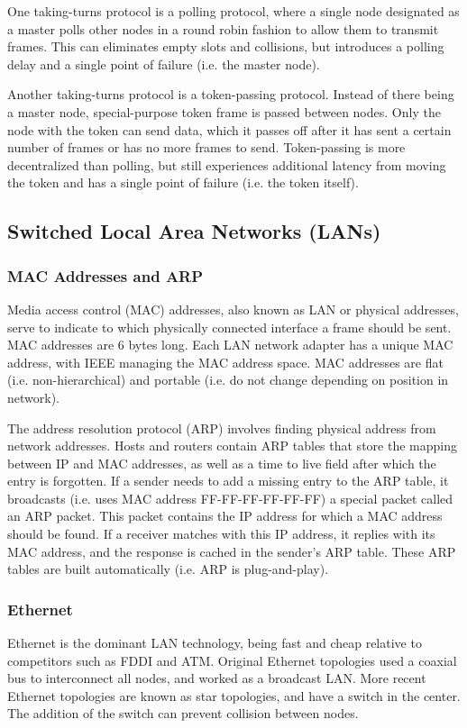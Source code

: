 \documentclass[12pt,titlepage]{article}
\begin{document}
        One taking-turns protocol is a polling protocol, where a single node designated as a master polls other nodes in a round robin fashion to allow them to
        transmit frames. This can eliminates empty slots and collisions, but introduces a polling delay and a single point of failure (i.e. the master node).

        Another taking-turns protocol is a token-passing protocol. Instead of there being a master node, special-purpose token frame is passed between nodes.
        Only the node with the token can send data, which it passes off after it has sent a certain number of frames or has no more frames to send. Token-passing
        is more decentralized than polling, but still experiences additional latency from moving the token and has a single point of failure (i.e. the token itself).

    \subsection{Switched Local Area Networks (LANs)}

      \subsubsection{MAC Addresses and ARP}
        Media access control (MAC) addresses, also known as LAN or physical addresses, serve to indicate to which physically connected interface a frame should be sent.
        MAC addresses are 6 bytes long. Each LAN network adapter has a unique MAC address, with IEEE managing the MAC address space. MAC addresses are flat
        (i.e. non-hierarchical) and portable (i.e. do not change depending on position in network).

        The address resolution protocol (ARP) involves finding physical address from network addresses. Hosts and routers contain ARP tables that store the mapping
        between IP and MAC addresses, as well as a time to live field after which the entry is forgotten. If a sender needs to add a missing entry to the ARP table,
        it broadcasts (i.e. uses MAC address FF-FF-FF-FF-FF-FF) a special packet called an ARP packet. This packet contains the IP address for which a MAC address
        should be found. If a receiver matches with this IP address, it replies with its MAC address, and the response is cached in the sender's ARP table. These
        ARP tables are built automatically (i.e. ARP is plug-and-play).

      \subsubsection{Ethernet}
        Ethernet is the dominant LAN technology, being fast and cheap relative to competitors such as FDDI and ATM. Original Ethernet topologies used a coaxial bus to
        interconnect all nodes, and worked as a broadcast LAN. More recent Ethernet topologies are known as star topologies, and have a switch in the center.
        The addition of the switch can prevent collision between nodes.
\end{document}
